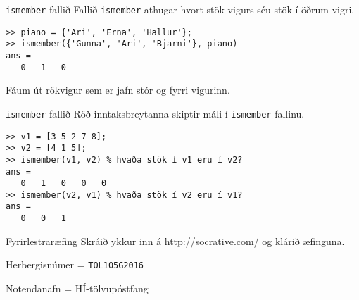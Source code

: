 \documentclass[handout]{beamer}
\begin{document}
\begin{frame}[fragile]{\texttt{ismember} fallið}
Fallið \texttt{ismember} athugar hvort stök vigurs séu stök í öðrum vigri.
\begin{verbatim}
>> piano = {'Ari', 'Erna', 'Hallur'};
>> ismember({'Gunna', 'Ari', 'Bjarni'}, piano)
ans =
   0   1   0
\end{verbatim}
Fáum út rökvigur sem er jafn stór og fyrri vigurinn.
\end{frame}

\begin{frame}[fragile]{\texttt{ismember} fallið}
Röð inntaksbreytanna skiptir máli í \texttt{ismember} fallinu.
\begin{verbatim}
>> v1 = [3 5 2 7 8];
>> v2 = [4 1 5];
>> ismember(v1, v2) % hvaða stök í v1 eru í v2?
ans =
   0   1   0   0   0
>> ismember(v2, v1) % hvaða stök í v2 eru í v1?
ans =
   0   0   1
\end{verbatim}
\end{frame}

\begin{frame}[fragile]{Fyrirlestraræfing}
Skráið ykkur inn á \url{http://socrative.com/} og klárið æfinguna.

Herbergisnúmer = \texttt{TOL105G2016}

Notendanafn = HÍ-tölvupóstfang
\end{frame}
\end{document}
